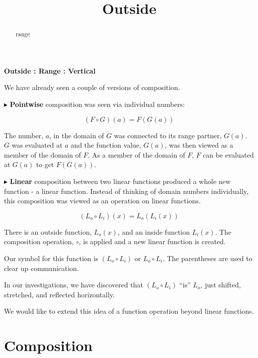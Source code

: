 \documentclass{ximera}
\title{Outside}
\begin{document}
\begin{abstract}
range
\end{abstract}
\maketitle






\textbf{\textcolor{blue!55!black}{Outside : Range : Vertical}}



We have already seen a couple of versions of composition. 


$\blacktriangleright$ \textbf{\textcolor{purple!85!blue}{Pointwise}} composition was seen via individual numbers: 

\[ (F \circ G)(a) = F(G(a)) \]

The number, $a$, in the domain of $G$ was connected to its range partner, $G(a)$.  $G$ was evaluated at $a$ and the function value, $G(a)$, was then viewed as a member of the domain of $F$.  As a member of the domain of $F$, $F$ can be evaluated at $G(a)$ to get $F(G(a))$. 




$\blacktriangleright$ \textbf{\textcolor{purple!85!blue}{Linear}} composition between two linear functions produced a whole new function - a linear function.  Instead of thinking of domain numbers individually, this composition was viewed as an operation on linear functions.

\[    (L_o \circ L_i)(x) = L_o(L_i(x))  \]

There is an outside function, $L_o(x)$, and an inside function $L_i(x)$.  The composition operation, $\circ$, is applied and a new linear function is created.  



Our symbol for this function is $(L_o \circ L_i)$ or $L_o \circ L_i$.  The parentheses are used to clear up communication.

In our investigations, we have discovered that $(L_o \circ L_i)$ ``is'' $L_o$, just shifted, stretched, and reflected horizontally.


We would like to extend this idea of a function operation beyond linear functions.





\section*{Composition}
\end{document}
